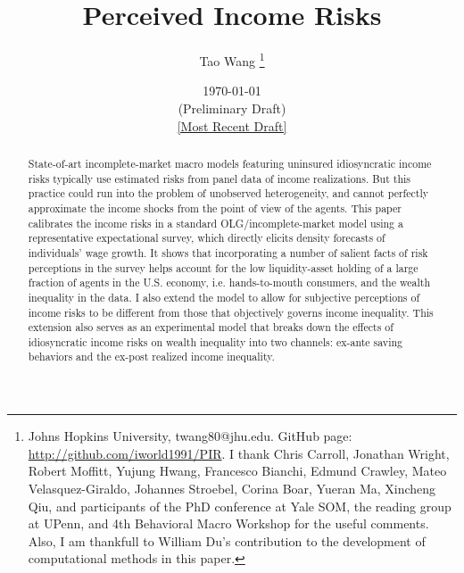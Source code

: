 \begin{titlepage}
 \title{Perceived Income Risks}
 
 \author{Tao Wang \thanks{Johns Hopkins University, twang80@jhu.edu. GitHub page: \url{http://github.com/iworld1991/PIR}. I thank Chris Carroll, Jonathan Wright, Robert Moffitt, Yujung Hwang, Francesco Bianchi, Edmund Crawley, Mateo Velasquez-Giraldo, Johannes Stroebel, Corina Boar, Yueran Ma, Xincheng Qiu, and participants of the PhD conference at Yale SOM, the reading group at UPenn, and 4th Behavioral Macro Workshop for the useful comments. Also, I am thankfull to William Du's contribution to the development of computational methods in this paper.}}

\date{\today \\(Preliminary Draft) \\\href{https://github.com/iworld1991/PIR/blob/master/PIR.pdf}{[Most Recent Draft]}}
	\maketitle
	\begin{abstract}
	\begin{singlespace}
		\noindent State-of-art incomplete-market macro models featuring uninsured idiosyncratic income risks typically use estimated risks from panel data of income realizations. But this practice could run into the problem of unobserved heterogeneity, and cannot perfectly approximate the income shocks from the point of view of the agents. This paper calibrates the income risks in a standard OLG/incomplete-market model using a representative expectational survey, which directly elicits density forecasts of individuals' wage growth. It shows that incorporating a number of salient facts of risk perceptions in the survey helps account for the low liquidity-asset holding of a large fraction of agents in the U.S. economy, i.e. hands-to-mouth consumers, and the wealth inequality in the data. I also extend the model to allow for subjective perceptions of income risks to be different from those that objectively governs income inequality. This extension also serves as an experimental model that breaks down the effects of idiosyncratic income risks on wealth inequality into two channels: ex-ante saving behaviors and the ex-post realized income inequality.
		

\end{singlespace}
\end{abstract}
\end{titlepage}
